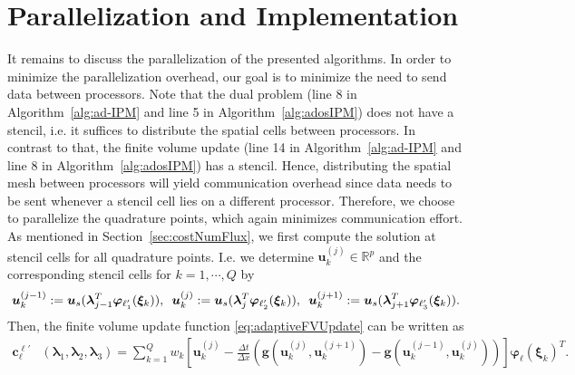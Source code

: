 \section{Parallelization and Implementation}
\label{sec:parallel}
It remains to discuss the parallelization of the presented algorithms. In order to minimize the parallelization overhead, our goal is to minimize the need to send data between processors. Note that the dual problem (line 8 in Algorithm~\ref{alg:ad-IPM} and line 5 in Algorithm~\ref{alg:adosIPM}) does not have a stencil, i.e. it suffices to distribute the spatial cells between processors. In contrast to that, the finite volume update (line 14 in Algorithm~\ref{alg:ad-IPM} and line 8 in Algorithm~\ref{alg:adosIPM}) has a stencil. Hence, distributing the spatial mesh between processors will yield communication overhead since data needs to be sent whenever a stencil cell lies on a different processor. Therefore, we choose to parallelize the quadrature points, which again minimizes communication effort. As mentioned in Section~\ref{sec:costNumFlux}, we first compute the solution at stencil cells for all quadrature points. I.e. we determine $\bm u^{(j)}_k\in\mathbb{R}^p$ and the corresponding stencil cells for $k = 1,\cdots,Q$ by
\begin{align*}
\bm u^{(j-1)}_k := \bm u_{s}(\bm{\lambda}_{j-1}^T\bm{\varphi}_{\ell_1'}(\bm \xi_k)), \enskip \bm u^{(j)}_k := \bm u_{s}(\bm{\lambda}_{j}^T\bm{\varphi}_{\ell_2'}(\bm \xi_k)), \enskip \bm u^{(j+1)}_k := \bm u_{s}(\bm{\lambda}_{j+1}^T\bm{\varphi}_{\ell_3'}(\bm \xi_k)).
\end{align*}
Then, the finite volume update function \eqref{eq:adaptiveFVUpdate} can be written as
\begin{align}\label{eq:momentUpQuadrature}
\bm{c}_{\ell}^{\bm{\ell}'}&\left(\bm{\lambda}_{1},\bm{\lambda}_2,\bm{\lambda}_3\right)=\sum_{k=1}^Q w_k \left[\bm u^{(j)}_k- \frac{\Delta t}{\Delta x}\left(\bm g( \bm u^{(j)}_k,\bm u^{(j+1)}_k )- \bm g( \bm u^{(j-1)}_k,\bm u^{(j)}_k )\right)\right]\bm{\varphi}_{\ell}(\bm \xi_k)^T.
\end{align}

